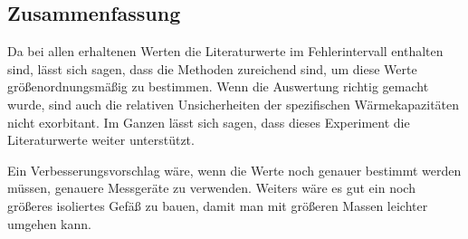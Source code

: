 \documentclass[11pt, ngerman]{scrartcl}
\begin{document}
\subsection{Zusammenfassung}

Da bei allen erhaltenen Werten die Literaturwerte im Fehlerintervall enthalten sind, lässt
sich sagen, dass die Methoden zureichend sind, um diese Werte größenordnungsmäßig
zu bestimmen. Wenn die Auswertung richtig gemacht wurde, sind auch die relativen
Unsicherheiten der spezifischen Wärmekapazitäten nicht exorbitant. Im Ganzen
lässt sich sagen, dass dieses Experiment die Literaturwerte weiter unterstützt.

Ein Verbesserungsvorschlag wäre, wenn die Werte noch genauer bestimmt werden
müssen, genauere Messgeräte zu verwenden. Weiters wäre es
gut ein noch größeres isoliertes Gefäß zu bauen, damit man
mit größeren Massen leichter umgehen kann.
\newpage
\printbibliography

\listoffigures

\listoftables
\end{document}
